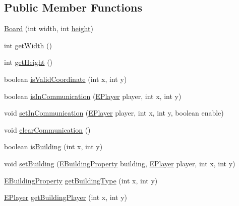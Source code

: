 \subsection*{Public Member Functions}
\begin{DoxyCompactItemize}
\item 
\mbox{\hyperlink{classgame_1_1board_1_1_board_a4a4512e961aaf295bb4227f6f3fc7981}{Board}} (int width, int \mbox{\hyperlink{classgame_1_1board_1_1_board_aa8312858518138c1cc8af3dd0e823c4d}{height}})
\item 
int \mbox{\hyperlink{classgame_1_1board_1_1_board_a831e13d9108a75d6efc5a92994ea1316}{get\+Width}} ()
\item 
int \mbox{\hyperlink{classgame_1_1board_1_1_board_a3c3b04d752eee7f25fcf2a57d0675374}{get\+Height}} ()
\item 
boolean \mbox{\hyperlink{classgame_1_1board_1_1_board_a02574586e2f8c3d6c4dd1672efdf0d68}{is\+Valid\+Coordinate}} (int x, int y)
\item 
boolean \mbox{\hyperlink{classgame_1_1board_1_1_board_aed2c46e80ddb40b36cbd09bb42b43974}{is\+In\+Communication}} (\mbox{\hyperlink{enumgame_1_1_e_player}{E\+Player}} player, int x, int y)
\item 
void \mbox{\hyperlink{classgame_1_1board_1_1_board_a47516ef1e79a14a60d65951e5fdc3817}{set\+In\+Communication}} (\mbox{\hyperlink{enumgame_1_1_e_player}{E\+Player}} player, int x, int y, boolean enable)
\item 
void \mbox{\hyperlink{classgame_1_1board_1_1_board_ab0f2fd4d06d165a3eb180023480f1421}{clear\+Communication}} ()
\item 
boolean \mbox{\hyperlink{classgame_1_1board_1_1_board_a6b6e3fb41b451a50ef9d5135067c2582}{is\+Building}} (int x, int y)
\item 
void \mbox{\hyperlink{classgame_1_1board_1_1_board_a663601f177534c45ffd3ded9838b54cc}{set\+Building}} (\mbox{\hyperlink{enumrule_engine_1_1entity_1_1_e_building_property}{E\+Building\+Property}} building, \mbox{\hyperlink{enumgame_1_1_e_player}{E\+Player}} player, int x, int y)
\item 
\mbox{\hyperlink{enumrule_engine_1_1entity_1_1_e_building_property}{E\+Building\+Property}} \mbox{\hyperlink{classgame_1_1board_1_1_board_ab5376949c9c2ee4fa825e3df27f798ed}{get\+Building\+Type}} (int x, int y)
\item 
\mbox{\hyperlink{enumgame_1_1_e_player}{E\+Player}} \mbox{\hyperlink{classgame_1_1board_1_1_board_a26945d3e21a7033fa9d6b26d61425fe2}{get\+Building\+Player}} (int x, int y)
\item 

\end{DoxyCompactItemize}
